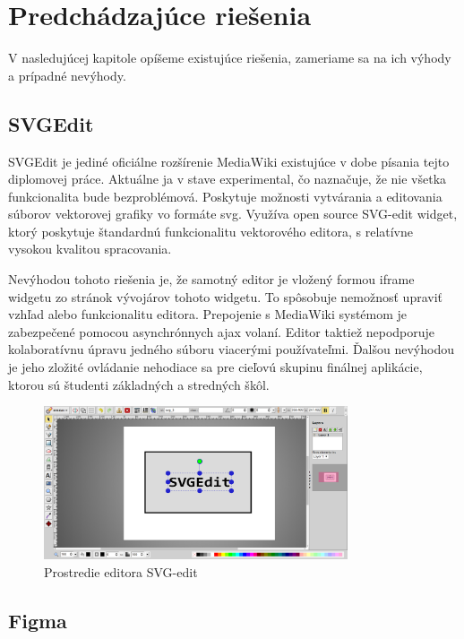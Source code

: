 \chapter{Predchádzajúce riešenia}\label{chap:previous_solutions}

V nasledujúcej kapitole opíšeme existujúce riešenia, zameriame sa na ich výhody a prípadné nevýhody.

\section{SVGEdit}

SVGEdit je jediné oficiálne rozšírenie MediaWiki existujúce v dobe písania tejto diplomovej práce. Aktuálne ja v stave experimental, čo naznačuje, že nie všetka funkcionalita bude bezproblémová. Poskytuje možnosti vytvárania a editovania súborov vektorovej grafiky vo formáte svg. Využíva open source SVG-edit widget, ktorý poskytuje štandardnú funkcionalitu vektorového editora, s relatívne vysokou kvalitou spracovania. 

Nevýhodou tohoto riešenia je, že samotný editor je vložený formou iframe widgetu zo stránok vývojárov tohoto widgetu. To spôsobuje nemožnosť upraviť vzhľad alebo funkcionalitu editora. Prepojenie s MediaWiki systémom je zabezpečené pomocou asynchrónnych ajax volaní. Editor taktiež nepodporuje kolaboratívnu úpravu jedného súboru viacerými používateľmi. Ďalšou nevýhodou je jeho zložité ovládanie nehodiace sa pre cieľovú skupinu finálnej aplikácie, ktorou sú študenti základných a stredných škôl.

\begin{figure}[h]
	\centerline{\includegraphics[width=0.8\textwidth]{images/svg-edit}}
	\caption[Editor SVG-edit]{Prostredie editora SVG-edit}
	\label{obr:SVGedit}
\end{figure}
\FloatBarrier


\section{Figma}

